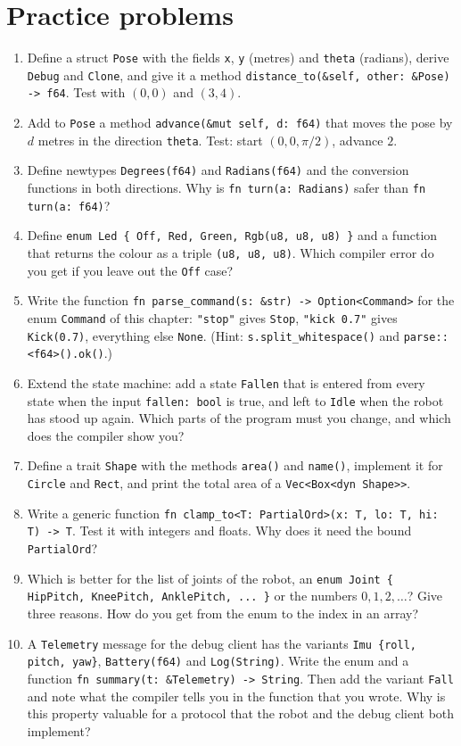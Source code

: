 \section*{Practice problems}
\begin{enumerate}[label=\textbf{\thechapter.\arabic*}]
  \item Define a struct \verb!Pose! with the fields \verb!x!, \verb!y! (metres) and \verb!theta! (radians), derive \verb!Debug! and \verb!Clone!, and give it a method \verb!distance_to(&self, other: &Pose) -> f64!. Test with $(0,0)$ and $(3,4)$.
  \item Add to \verb!Pose! a method \verb!advance(&mut self, d: f64)! that moves the pose by $d$ metres in the direction \verb!theta!. Test: start $(0,0,\pi/2)$, advance $2$.
  \item Define newtypes \verb!Degrees(f64)! and \verb!Radians(f64)! and the conversion functions in both directions. Why is \verb!fn turn(a: Radians)! safer than \verb!fn turn(a: f64)!?
  \item Define \verb!enum Led { Off, Red, Green, Rgb(u8, u8, u8) }! and a function that returns the colour as a triple \verb!(u8, u8, u8)!. Which compiler error do you get if you leave out the \verb!Off! case?
  \item Write the function \verb!fn parse_command(s: &str) -> Option<Command>! for the enum \verb!Command! of this chapter: \verb!"stop"! gives \verb!Stop!, \verb!"kick 0.7"! gives \verb!Kick(0.7)!, everything else \verb!None!. (Hint: \verb!s.split_whitespace()! and \verb!parse::<f64>().ok()!.)
  \item Extend the state machine: add a state \verb!Fallen! that is entered from every state when the input \verb!fallen: bool! is true, and left to \verb!Idle! when the robot has stood up again. Which parts of the program must you change, and which does the compiler show you?
  \item Define a trait \verb!Shape! with the methods \verb!area()! and \verb!name()!, implement it for \verb!Circle! and \verb!Rect!, and print the total area of a \verb!Vec<Box<dyn Shape>>!.
  \item Write a generic function \verb!fn clamp_to<T: PartialOrd>(x: T, lo: T, hi: T) -> T!. Test it with integers and floats. Why does it need the bound \verb!PartialOrd!?
  \item Which is better for the list of joints of the robot, an \verb!enum Joint { HipPitch, KneePitch, AnklePitch, ... }! or the numbers $0,1,2,\dots$? Give three reasons. How do you get from the enum to the index in an array?
  \item[\textbf{\thechapter.10}$\star$] A \verb!Telemetry! message for the debug client has the variants \verb!Imu {roll, pitch, yaw}!, \verb!Battery(f64)! and \verb!Log(String)!. Write the enum and a function \verb!fn summary(t: &Telemetry) -> String!. Then add the variant \verb!Fall! and note what the compiler tells you in the function that you wrote. Why is this property valuable for a protocol that the robot and the debug client both implement?
\end{enumerate}
